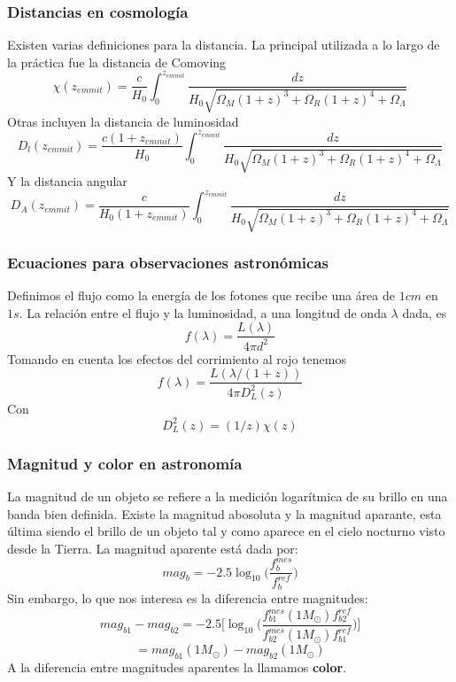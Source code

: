 \documentclass{beamer}
\begin{document}
	\begin{frame}
		\frametitle{Distancias en cosmología}
		Existen varias definiciones para la distancia. La principal utilizada a lo largo de la práctica fue la distancia de Comoving
		$$\chi(z_{emmit})=\frac{c}{H_0}\int_{0}^{z_{emmit}} \frac{dz}{H_0\sqrt{\Omega_M(1+z)^3+\Omega_R(1+z)^4+\Omega_\Lambda}}$$
		Otras incluyen la distancia de luminosidad 
		$$D_l(z_{emmit})=\frac{c(1+z_{emmit})}{H_0}\int_{0}^{z_{emmit}} \frac{dz}{H_0\sqrt{\Omega_M(1+z)^3+\Omega_R(1+z)^4+\Omega_\Lambda}}$$
		Y la distancia angular
		$$D_A(z_{emmit})=\frac{c}{H_0(1+z_{emmit})}\int_{0}^{z_{emmit}} \frac{dz}{H_0\sqrt{\Omega_M(1+z)^3+\Omega_R(1+z)^4+\Omega_\Lambda}}$$
	\end{frame}

\begin{frame}
\frametitle{Ecuaciones para observaciones astronómicas}
Definimos el flujo como la energía de los fotones que recibe una área de $1 cm$ en $1 s$. La relación entre el flujo y la luminosidad, a una longitud de onda $\lambda$ dada, es
	$$f(\lambda)=\frac{L(\lambda)}{4\pi d^2}$$
Tomando en cuenta los efectos del corrimiento al rojo tenemos
	$$f(\lambda)=\frac{L(\lambda /(1+z))}{4\pi D^2_L(z)}$$
Con 
$$D^2_L(z)=(1/z)\chi (z)$$

\end{frame}

\begin{frame}
\frametitle{Magnitud y color en astronomía}
La magnitud de un objeto se refiere a la medición logarítmica de su brillo en una banda bien definida. Existe la magnitud abosoluta y la magnitud aparante, esta última siendo el brillo de un objeto tal y como aparece en el cielo nocturno visto desde la Tierra. La magnitud aparente está dada por:
$$mag_b=-2.5 \log_{10} \bigg(\frac{f^{mes}_b}{f^{ref}_b}\bigg)$$
Sin embargo, lo que nos interesa es la diferencia entre magnitudes:
$$mag_{b1}-mag_{b2}=-2.5\bigg[\log_{10} \bigg(\frac{f^{mes}_{b1}(1M_\odot)f^{ref}_{b2}}{f^{mes}_{b2}(1M_\odot)f^{ref}_{b1}}\bigg)\bigg]$$
$$=mag_{b1}(1M_\odot)-mag_{b2}(1M_\odot)$$
A la diferencia entre magnitudes aparentes la llamamos \textbf{color}.
\end{frame}
\end{document}
